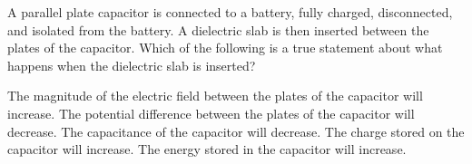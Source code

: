 \documentclass{../../../oss-apphys-exam}
\begin{document}

\raggedcolumns


\begin{questions}
  \question A parallel plate capacitor is connected to a battery,
  fully charged, disconnected, and isolated from the battery. A dielectric slab
  is then inserted between the plates of the capacitor. Which of the following
  is a true statement about what happens when the dielectric slab is inserted?
  \begin{choices}
    \choice The magnitude of the electric field between the plates of the
    capacitor will increase.
    \choice The potential difference between the plates of the capacitor will
    decrease.
    \choice The capacitance of the capacitor will decrease.
    \choice The charge stored on the capacitor will increase.
    \choice The energy stored in the capacitor will increase.
  \end{choices}

  

\end{questions}
\end{document}
